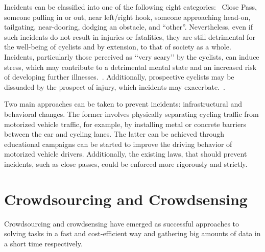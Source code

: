 Incidents can be classified into one of the following eight categories:~\cite{aldred2015investigating,aldred2016cycling,aldred2018predictors}
Close Pass, someone pulling in or out, near left/right hook, someone approaching head-on, tailgating, near-dooring, dodging an obstacle, and “other”.
Nevertheless, even if such incidents do not result in injuries or fatalities, they are still detrimental for the well-being of cyclists and by extension, to that of society as a whole.
Incidents, particularly those perceived as ‘‘very scary’’ by the cyclists, can induce stress, which may contribute to a detrimental mental state and an increased risk of developing further illnesses.~\cite{yaribeygi2017impact}.
Additionally, prospective cyclists may be dissuaded by the prospect of injury, which incidents may exacerbate.~\cite{aldred2015investigating}.

Two main approaches can be taken to prevent incidents: infrastructural and behavioral changes.
The former involves physically separating cycling traffic from motorized vehicle traffic, for example, by installing metal or concrete barriers between the car and cycling lanes.
The latter can be achieved through educational campaigns can be started to improve the driving behavior of motorized vehicle drivers.
Additionally, the existing laws, that should prevent incidents, such as close passes, could be enforced more rigorously and strictly. 


\section{Crowdsourcing and Crowdsensing}
\label{sec:crowdsourcing_crowdsensing_background}
Crowdsourcing and crowdsensing have emerged as successful approaches to solving tasks in a fast and cost-efficient way and gathering big amounts of data in a short time respectively.

